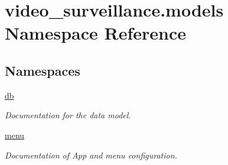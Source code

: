 \hypertarget{namespacevideo__surveillance_1_1models}{}\section{video\+\_\+surveillance.\+models Namespace Reference}
\label{namespacevideo__surveillance_1_1models}
\subsection*{Namespaces}
\begin{DoxyCompactItemize}
\item 
 \hyperlink{namespacevideo__surveillance_1_1models_1_1db}{db}
\begin{DoxyCompactList}\small\item\em Documentation for the data model. \end{DoxyCompactList}\item 
 \hyperlink{namespacevideo__surveillance_1_1models_1_1menu}{menu}
\begin{DoxyCompactList}\small\item\em Documentation of App and menu configuration. \end{DoxyCompactList}\end{DoxyCompactItemize}
